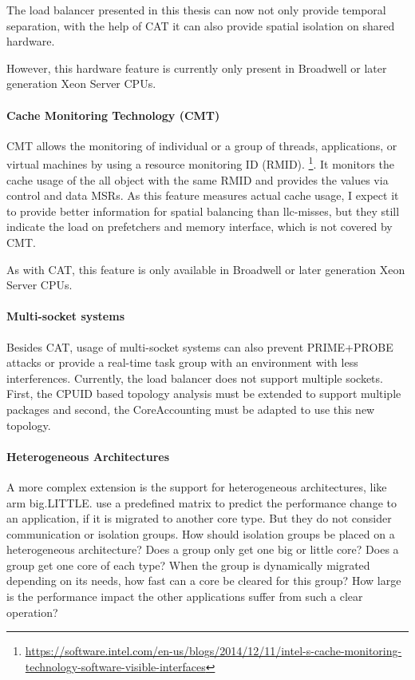 The load balancer presented in  this thesis can now not only provide temporal
separation, with the help of CAT it can also provide spatial isolation on
shared hardware.

However, this hardware feature is currently only present in Broadwell or later
generation Xeon Server CPUs.

\paragraph{Cache Monitoring Technology (CMT)}
CMT allows the monitoring of individual or a group of threads, applications, or
virtual machines by using a resource monitoring ID (RMID).
\footnote{\url{https://software.intel.com/en-us/blogs/2014/12/11/intel-s-cache-monitoring-technology-software-visible-interfaces}}.
It monitors the cache usage of the all object with the same RMID and provides
the values via control and data MSRs.
As this feature measures actual cache usage, I expect it to provide better
information for spatial balancing than \gls{llc}-misses, but they still
indicate the load on prefetchers and memory interface, which is not covered by
CMT.

As with CAT, this feature is only available in Broadwell or later generation
Xeon Server CPUs.

\paragraph{Multi-socket systems}
Besides CAT, usage of multi-socket systems can also prevent PRIME+PROBE attacks
or provide a real-time task group with an environment with less interferences.
Currently, the load balancer does not support multiple sockets.
First, the CPUID based topology analysis must be extended to support multiple
packages and second, the CoreAccounting must be adapted to use this new
topology.

\paragraph{Heterogeneous Architectures}
A more complex extension is the support for heterogeneous architectures, like
\gls{arm} big.LITTLE.
\citeauthor{sarma_smartbalance_2015} use a predefined matrix to predict the
performance change to an application, if it is migrated to another core type.
But they do not consider communication or isolation groups.
How should isolation groups be placed on a heterogeneous architecture?
Does a group only get one big or little core?
Does a group get one core of each type?
When the group is dynamically migrated depending on its needs, how fast can a
core be cleared for this group?
How large is the performance impact the other applications suffer from such a
clear operation?


